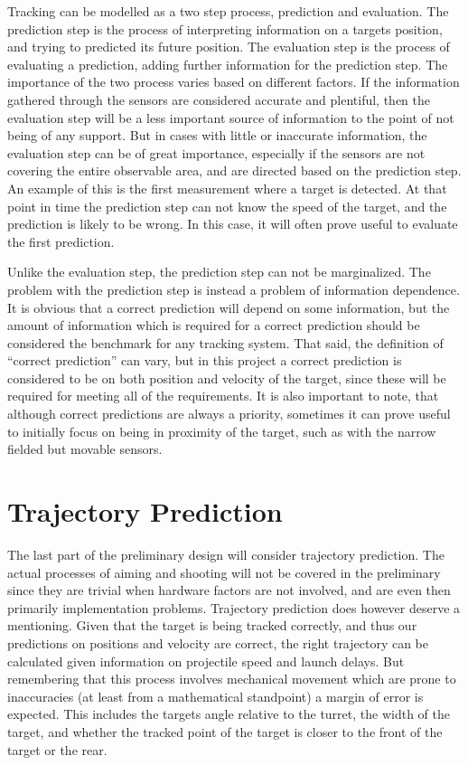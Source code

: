 Tracking can be modelled as a two step process, prediction and evaluation. The prediction step is the process of interpreting information on a targets position, and trying to predicted its future position. The evaluation step is the process of evaluating a prediction, adding further information for the prediction step. The importance of the two process varies based on different factors. If the information gathered through the sensors are considered accurate and plentiful, then the evaluation step will be a less important source of information to the point of not being of any support. But in cases with little or inaccurate information, the evaluation step can be of great importance, especially if the sensors are not covering the entire observable area, and are directed based on the prediction step. An example of this is the first measurement where a target is detected. At that point in time the prediction step can not know the speed of the target, and the prediction is likely to be wrong. In this case, it will often prove useful to evaluate the first prediction.

Unlike the evaluation step, the prediction step can not be marginalized. The problem with the prediction step is instead a problem of information dependence. It is obvious that a correct prediction will depend on some information, but the amount of information which is required for a correct prediction should be considered the benchmark for any tracking system. That said, the definition of \enquote{correct prediction} can vary, but in this project a correct prediction is considered to be on both position and velocity of the target, since these will be required for meeting all of the requirements. It is also important to note, that although correct predictions are always a priority, sometimes it can prove useful to initially focus on being in proximity of the target, such as with the narrow fielded but movable sensors.

\section{Trajectory Prediction}\label{predesign:shoot}

The last part of the preliminary design will consider trajectory prediction. The actual processes of aiming and shooting will not be covered in the preliminary since they are trivial when hardware factors are not involved, and are even then primarily implementation problems. Trajectory prediction does however deserve a mentioning. Given that the target is being tracked correctly, and thus our predictions on positions and velocity are correct, the right trajectory can be calculated given information on projectile speed and launch delays. But remembering that this process involves mechanical movement which are prone to inaccuracies (at least from a mathematical standpoint) a margin of error is expected. This includes the targets angle relative to the turret, the width of the target, and whether the tracked point of the target is closer to the front of the target or the rear.\\
\eal